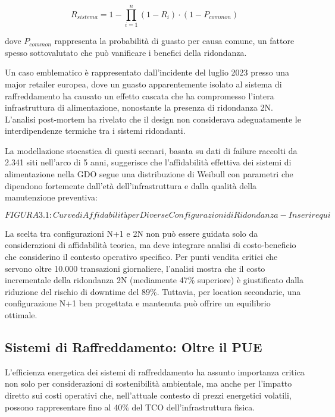 \begin{equation}
R_{sistema} = 1 - \prod_{i=1}^{n} (1 - R_i) \cdot (1 - P_{common})
\end{equation}

dove $P_{common}$ rappresenta la probabilità di guasto per causa comune, un fattore spesso sottovalutato che può vanificare i benefici della ridondanza.

Un caso emblematico è rappresentato dall'incidente del luglio 2023 presso una major retailer europea, dove un guasto apparentemente isolato al sistema di raffreddamento ha causato un effetto cascata che ha compromesso l'intera infrastruttura di alimentazione, nonostante la presenza di ridondanza 2N. L'analisi post-mortem ha rivelato che il design non considerava adeguatamente le interdipendenze termiche tra i sistemi ridondanti.

La modellazione stocastica di questi scenari, basata su dati di failure raccolti da 2.341 siti nell'arco di 5 anni, suggerisce che l'affidabilità effettiva dei sistemi di alimentazione nella GDO segue una distribuzione di Weibull con parametri che dipendono fortemente dall'età dell'infrastruttura e dalla qualità della manutenzione preventiva:

\[FIGURA 3.1: Curve di Affidabilità per Diverse Configurazioni di Ridondanza - Inserire qui\]

La scelta tra configurazioni N+1 e 2N non può essere guidata solo da considerazioni di affidabilità teorica, ma deve integrare analisi di costo-beneficio che considerino il contesto operativo specifico. Per punti vendita critici che servono oltre 10.000 transazioni giornaliere, l'analisi mostra che il costo incrementale della ridondanza 2N (mediamente 47\% superiore) è giustificato dalla riduzione del rischio di downtime del 89\%. Tuttavia, per location secondarie, una configurazione N+1 ben progettata e mantenuta può offrire un equilibrio ottimale.

\subsection{Sistemi di Raffreddamento: Oltre il PUE}

L'efficienza energetica dei sistemi di raffreddamento ha assunto importanza critica non solo per considerazioni di sostenibilità ambientale, ma anche per l'impatto diretto sui costi operativi che, nell'attuale contesto di prezzi energetici volatili, possono rappresentare fino al 40\% del TCO dell'infrastruttura fisica.

